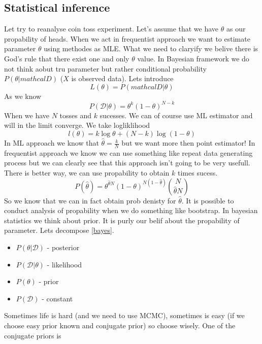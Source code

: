 \documentclass[12pt,a4paper]{article}
\begin{document}
\subsection{Statistical inference}
Let try to reanalyse coin toss experiment. Let's assume that we have $\theta$ as our propability of heads. When we act in frequentist approach we want to estimate parameter
$\theta$ using methodes as MLE. What we need to claryify we belive there is God's rule that there exist one and only $\theta$ value. In Bayesian framework we do not think aobut tru parameter but 
rather conditional probability $P(\theta|mathcal{D})$ ($X$ is observed data). Lets introduce
\begin{equation}
    L(\theta)=P(mathcal{D}|\theta)
\end{equation}
As we know
\begin{equation}
    P(\mathcal{D}|\theta)=\theta^k(1-\theta)^{N-k}
\end{equation}
When we have $N$ tosses and $k$ sucesses. We can of course use ML estimator and will in the limit converge.
We take logliklihood
\begin{equation}
    l(\theta)=k\log\theta+(N-k)\log{(1-\theta)}
\end{equation}
In ML approach we know that $\hat{\theta}=\frac{k}{N}$ but we want more then point estimator! In frequentist approach we know we can use something like repeat data generating process 
but we can clearly see that this approach isn't going to be very usefull. There is better way, we can use propability to obtain $k$ times sucess.
\begin{equation}
    P(\hat{\theta})=\theta^{\hat{\theta}N}(1-\theta)^{N(1-\hat{\theta})}{N \choose \hat{\theta}N }
\end{equation}
So we know that we can in fact obtain prob denisty for $\hat{\theta}$. It is possible to conduct analysis of propability when we do something like bootstrap. In 
bayesian statistics we think about prior. It is purly our belif about the propability of parameter. Lets decompose \ref{bayes}.
\begin{itemize}
    \item $P(\theta|\mathcal{D})$ - posterior
    \item $P(\mathcal{D}|\theta)$ - likelihood
    \item $P(\theta)$ - prior
    \item $P(\mathcal{D})$ - constant
\end{itemize}
Sometimes life is hard (and we need to use MCMC), sometimes is easy (if we choose easy prior known and conjugate prior) so choose wisely. One of the conjugate priors is 
\end{document}
